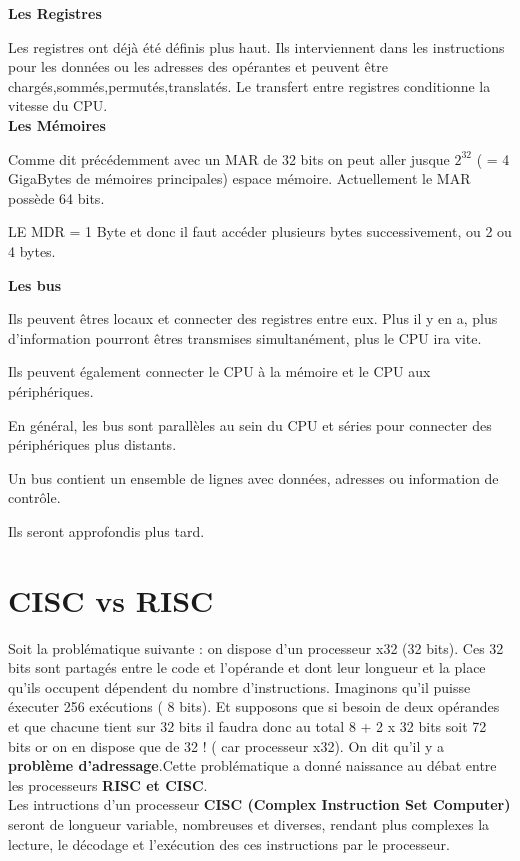 \documentclass{report}
\begin{document}
{\bf Les Registres}


Les registres ont déjà été définis plus haut.
Ils interviennent dans les instructions pour les données ou les adresses des opérantes et peuvent être chargés,sommés,permutés,translatés.
Le transfert entre registres conditionne la vitesse du CPU.\\

{\bf Les Mémoires}

Comme dit précédemment avec un MAR de 32 bits on peut aller jusque $2^{32}$ ( = 4 GigaBytes de mémoires principales) espace mémoire. Actuellement le MAR possède 64 bits.

LE MDR = 1 Byte et donc il faut accéder plusieurs bytes successivement, ou 2 ou 4 bytes. 



{\bf Les bus}

Ils peuvent êtres locaux et connecter des registres entre eux. Plus il y en a, plus d'information pourront êtres transmises simultanément, plus le CPU ira vite.

Ils peuvent également connecter le CPU à la mémoire et le CPU aux périphériques.

En général, les bus sont parallèles au sein du CPU et séries pour connecter des périphériques plus distants.

Un bus contient un ensemble de lignes avec données, adresses ou information de contrôle.

Ils seront approfondis plus tard.\\

\section{CISC vs RISC} 

Soit la problématique suivante : on dispose d'un processeur x32 (32 bits).
Ces 32 bits sont partagés entre le code et l'opérande et dont leur longueur et la place qu'ils occupent dépendent du nombre d'instructions.
Imaginons qu'il puisse éxecuter 256 exécutions ( 8 bits). Et supposons que si besoin de deux opérandes et que chacune tient sur 32 bits il faudra donc au total 8 + 2 x 32 bits soit 72 bits or on en dispose que de 32 ! ( car processeur x32). On dit qu'il y a {\bf problème d'adressage}.Cette problématique a donné naissance au débat entre les processeurs {\bf RISC et CISC}.\\

Les intructions d'un processeur {\bf CISC (Complex Instruction Set Computer) }seront de longueur variable, nombreuses et diverses, rendant plus complexes la lecture, le décodage et l'exécution des ces instructions par le processeur.
\end{document}
